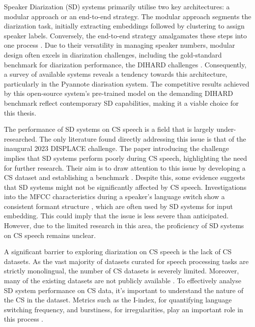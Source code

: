 \documentclass[11pt, a4paper]{report}
\begin{document}
Speaker Diarization (SD) systems primarily utilise two key architectures: a
modular approach or an end-to-end strategy. The modular approach segments 
the diarization task, initially extracting embeddings followed by 
clustering to assign speaker labels. Conversely, the end-to-end strategy 
amalgamates these steps into one process \cite{parkReviewSpeakerDiarization2021}. 
Due to their versatility in managing speaker numbers, modular design often excels 
in diarization challenges, including the gold-standard benchmark for diarization 
performance, the DIHARD challenges \cite{heoNAVERCLOVASUBMISSION}. 
Consequently, a survey of available systems reveals a tendency towards this architecture, 
particularly in the Pyannote diarisation system. The competitive results achieved by 
this open-source system's pre-trained model on the demanding DIHARD benchmark 
\cite{PyannoteSpeakerdiarizationHugging2023} reflect contemporary SD capabilities, 
making it a viable choice for this thesis.

\vspace*{10pt}
The performance of SD systems on CS speech is a field that is largely under-researched.
The only literature found directly addressing this issue is that of the inaugural 
2023 DISPLACE challenge. The paper introducing the challenge implies that SD systems 
perform poorly during CS speech, highlighting the need for further research. Their 
aim is to draw attention to this issue by developing a CS dataset and establishing a benchmark 
\cite{baghelDISPLACEChallengeDIarization2023b}.
Despite this, some evidence suggests that SD systems might not be significantly 
affected by CS speech. Investigations into the MFCC characteristics during a speaker's language 
switch show a consistent formant structure \cite{mishraChallengesSpokenLanguage2023}, 
which are often used by SD systems for input embedding. This could imply that the issue 
is less severe than anticipated. However, due to the limited research in this area, the 
proficiency of SD systems on CS speech remains unclear.

\vspace*{10pt}
A significant barrier to exploring diarization on CS speech is the lack of CS datasets. 
As the vast majority of datasets curated for speech processing tasks are strictly 
monolingual, the number of CS datasets is severely limited. Moreover, many of the 
existing datasets are not publicly available \cite[9]{sitaramSurveyCodeswitchedSpeech2020}.
To effectively analyse SD system performance on CS data, it's important to understand 
the nature of the CS in the dataset. Metrics such as the I-index, for quantifying 
language switching frequency, and burstiness, for irregularities, play an important 
role in this process \cite{guzmanMetricsModelingCodeSwitching2017}.
\end{document}
